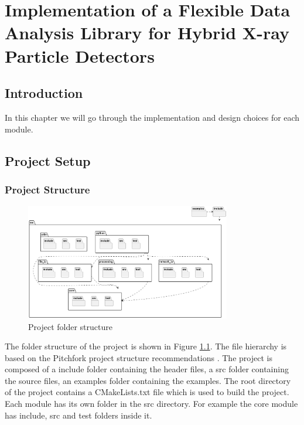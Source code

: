 
\setcounter{chapter}{2}
\chapter{Implementation of a Flexible Data Analysis Library for Hybrid X-ray Particle Detectors }
\minitoc %
\graphicspath{{Chapitre3/figures/}}

\pagestyle{fancy}
\fancyhf{}
\fancyhead[R]{\bfseries\rightmark}
\fancyfoot[R]{\thepage}
\renewcommand{\headrulewidth}{0.5pt}
\renewcommand{\footrulewidth}{0pt}
\renewcommand{\chaptermark}[1]{\markboth{{\chaptername~\thechapter. #1 }}{}}
\renewcommand{\sectionmark}[1]{\markright{\thechapter.\thesection~ #1}}

\begin{spacing}{1.2}

    \section*{Introduction}
    In this chapter we will go through the implementation and design choices for each module.

    \section{Project Setup}
    \subsection{Project Structure}
    \begin{figure}[hb]
        \centering
        \includegraphics[width=0.8\textwidth]{Chapitre3/figures/folders.png}
        \caption{Project folder structure}
        \label{fig:folders}
    \end{figure}
    The folder structure of the project is shown in Figure \ref{fig:folders}. The file hierarchy
    is based on the Pitchfork project structure recommendations \cite{pitchfork}.
    The project is composed of a include folder containing the header files,
    a src folder containing the source files,
    an examples folder containing the examples.
    The root directory of the project contains a CMakeLists.txt file which is used to build the project.
    Each module has its own folder in the src directory.
    For example the core module has include, src and test folders inside it.





\end{spacing}
